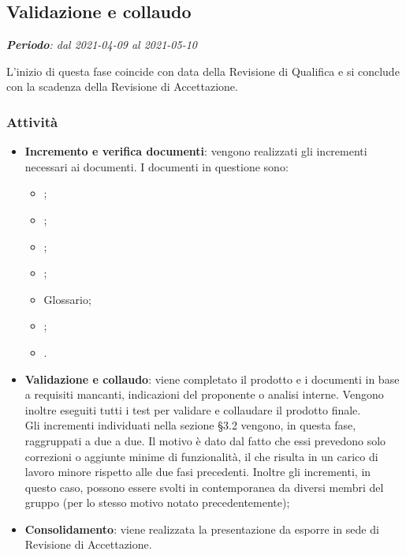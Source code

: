 \subsection{Validazione e collaudo}
\textit{\textbf{Periodo}: dal 2021-04-09 al 2021-05-10}

L'inizio di questa fase coincide con data della Revisione di Qualifica e si conclude con la scadenza della Revisione di Accettazione.

\subsubsection{Attività}

\begin{itemize}
\item \textbf{Incremento e verifica documenti}: vengono realizzati gli incrementi necessari ai documenti. I documenti in questione sono:
\begin{itemize}
\item \NdP{};
\item \AdR{};
\item \PdQ{};
\item \PdP{};
\item Glossario;
\item \MU{};
\item \MM{}.
\end{itemize}
\item \textbf{Validazione e collaudo}: viene completato il prodotto e i documenti in base a requisiti mancanti, indicazioni del proponente o analisi interne. Vengono inoltre eseguiti tutti i test per validare e collaudare il prodotto finale.\\ Gli incrementi individuati nella sezione \S{3.2} vengono, in questa fase, raggruppati a due a due. Il motivo è dato dal fatto che essi prevedono solo correzioni o aggiunte minime di funzionalità, il che risulta in un carico di lavoro minore rispetto alle due fasi precedenti. Inoltre gli incrementi, in questo caso, possono essere svolti in contemporanea da diversi membri del gruppo (per lo stesso motivo notato precedentemente);
\item \textbf{Consolidamento}: viene realizzata la presentazione da esporre in sede di Revisione di Accettazione.
\end{itemize}





